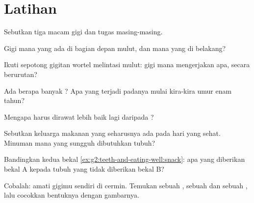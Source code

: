 \section{Latihan}

\begin{exercise}[$\star$]\label{exo:g2:teeth-and-eating-well:1}
Sebutkan tiga macam gigi dan tugas masing-masing.
\end{exercise}

\begin{exercise}[$\star$]\label{exo:g2:teeth-and-eating-well:2}
Gigi mana yang ada di bagian depan mulut, dan mana yang di belakang?
\end{exercise}

\begin{exercise}[$\star$]\label{exo:g2:teeth-and-eating-well:3}
Ikuti sepotong gigitan wortel melintasi mulut: gigi mana mengerjakan
apa, secara berurutan?
\end{exercise}

\begin{exercise}[$\star$]\label{exo:g2:teeth-and-eating-well:4}
Ada berapa banyak ? Apa yang terjadi padanya mulai kira-kira
umur enam tahun?
\end{exercise}

\begin{exercise}[$\star$]\label{exo:g2:teeth-and-eating-well:5}
Mengapa  harus dirawat lebih baik lagi daripada ?
\end{exercise}

\begin{exercise}[$\star$]\label{exo:g2:teeth-and-eating-well:6}
Sebutkan keluarga makanan yang seharusnya ada pada hari yang sehat.
Minuman mana yang sungguh dibutuhkan tubuh?
\end{exercise}

\begin{exercise}[$\star$]\label{exo:g2:teeth-and-eating-well:7}
Bandingkan kedua bekal \cref{ex:g2:teeth-and-eating-well:snack}: apa
yang diberikan bekal A kepada tubuh yang tidak diberikan bekal B?
\end{exercise}

\begin{exercise}[$\star$]\label{exo:g2:teeth-and-eating-well:8}
Cobalah: amati gigimu sendiri di cermin. Temukan sebuah ,
sebuah  dan sebuah , lalu cocokkan bentuknya
dengan gambarnya.
\end{exercise}

